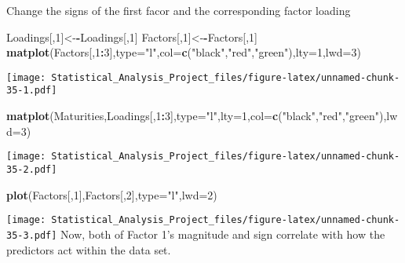 \documentclass[]{article}
\newenvironment{Shaded}{\begin{snugshade}}{\end{snugshade}}
\newcommand{\KeywordTok}[1]{\textcolor[rgb]{0.13,0.29,0.53}{\textbf{#1}}}
\newcommand{\DataTypeTok}[1]{\textcolor[rgb]{0.13,0.29,0.53}{#1}}
\newcommand{\DecValTok}[1]{\textcolor[rgb]{0.00,0.00,0.81}{#1}}
\newcommand{\StringTok}[1]{\textcolor[rgb]{0.31,0.60,0.02}{#1}}
\newcommand{\OperatorTok}[1]{\textcolor[rgb]{0.81,0.36,0.00}{\textbf{#1}}}
\newcommand{\NormalTok}[1]{#1}
\begin{document}
Change the signs of the first facor and the corresponding factor loading

\begin{Shaded}
\begin{Highlighting}[]
\NormalTok{Loadings[,}\DecValTok{1}\NormalTok{]<-}\OperatorTok{-}\NormalTok{Loadings[,}\DecValTok{1}\NormalTok{]}
\NormalTok{Factors[,}\DecValTok{1}\NormalTok{]<-}\OperatorTok{-}\NormalTok{Factors[,}\DecValTok{1}\NormalTok{]}
\KeywordTok{matplot}\NormalTok{(Factors[,}\DecValTok{1}\OperatorTok{:}\DecValTok{3}\NormalTok{],}\DataTypeTok{type=}\StringTok{"l"}\NormalTok{,}\DataTypeTok{col=}\KeywordTok{c}\NormalTok{(}\StringTok{"black"}\NormalTok{,}\StringTok{"red"}\NormalTok{,}\StringTok{"green"}\NormalTok{),}\DataTypeTok{lty=}\DecValTok{1}\NormalTok{,}\DataTypeTok{lwd=}\DecValTok{3}\NormalTok{)}
\end{Highlighting}
\end{Shaded}

\texttt{[image: Statistical\_Analysis\_Project\_files/figure-latex/unnamed-chunk-35-1.pdf]}

\begin{Shaded}
\begin{Highlighting}[]
\KeywordTok{matplot}\NormalTok{(Maturities,Loadings[,}\DecValTok{1}\OperatorTok{:}\DecValTok{3}\NormalTok{],}\DataTypeTok{type=}\StringTok{"l"}\NormalTok{,}\DataTypeTok{lty=}\DecValTok{1}\NormalTok{,}\DataTypeTok{col=}\KeywordTok{c}\NormalTok{(}\StringTok{"black"}\NormalTok{,}\StringTok{"red"}\NormalTok{,}\StringTok{"green"}\NormalTok{),}\DataTypeTok{lwd=}\DecValTok{3}\NormalTok{)}
\end{Highlighting}
\end{Shaded}

\texttt{[image: Statistical\_Analysis\_Project\_files/figure-latex/unnamed-chunk-35-2.pdf]}

\begin{Shaded}
\begin{Highlighting}[]
\KeywordTok{plot}\NormalTok{(Factors[,}\DecValTok{1}\NormalTok{],Factors[,}\DecValTok{2}\NormalTok{],}\DataTypeTok{type=}\StringTok{"l"}\NormalTok{,}\DataTypeTok{lwd=}\DecValTok{2}\NormalTok{)}
\end{Highlighting}
\end{Shaded}

\texttt{[image: Statistical\_Analysis\_Project\_files/figure-latex/unnamed-chunk-35-3.pdf]}
Now, both of Factor 1's magnitude and sign correlate with how the
predictors act within the data set.
\end{document}
